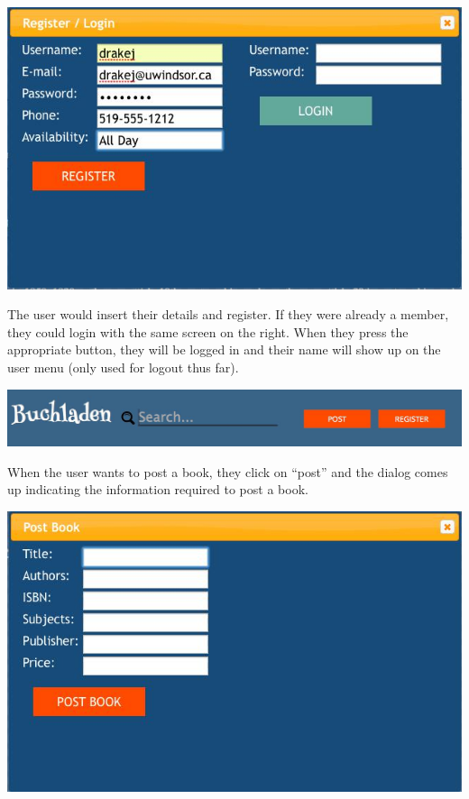 \documentclass[11pt]{article}
\begin{document}
\centerline{\includegraphics[scale=0.5]{./images/register.jpg}}

\vspace{0.1in}

The user would insert their details and register. If they were already
a member, they could login with the same screen on the right. When
they press the appropriate button, they will be logged in and their
name will show up on the user menu (only used for logout thus far).

\vspace{0.2in}

\centerline{\includegraphics[scale=0.3]{./images/walkthrough-1.jpg}}

\vspace{0.1in}

When the user wants to post a book, they click on ``post'' and the
dialog comes up indicating the information required to post a book.

\vspace{0.2in}

\centerline{\includegraphics[scale=0.5]{./images/post-book.jpg}}
\end{document}
